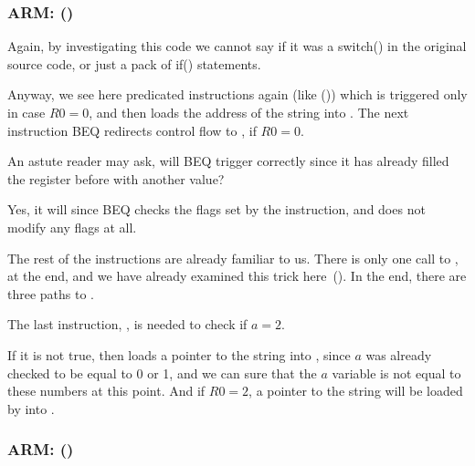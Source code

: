 \subsubsection{ARM: \OptimizingKeilVI (\ARMMode)}



Again, by investigating this code we cannot say if it was a switch() in the original source code, 
or just a pack of if() statements.


Anyway, we see here predicated instructions again (like \ADREQ ())
which is triggered only in case $R0=0$, and then loads the address of the string 
into .
The next instruction \ac{BEQ} redirects control flow to , if $R0=0$.

An astute reader may ask, will \ac{BEQ} trigger correctly since \ADREQ it
has already filled the  register before with another value?

Yes, it will since \ac{BEQ} checks the flags set by the \CMP instruction, 
and \ADREQ does not modify any flags at all.

The rest of the instructions are already familiar to us. 
There is only one call to \printf , at the end, and we have already examined this trick here~().
In the end, there are three paths to \printf{}.

The last instruction, , is needed to check if $a=2$.

If it is not true, then \ADRNE loads a pointer to the string 
into , since $a$ was already checked to be equal to 0 or 1,
and we can sure that the $a$ variable is not equal to these numbers at this point.
And if $R0=2$, 
a pointer to the string 
will be loaded by \ADREQ into .

\subsubsection{ARM: \OptimizingKeilVI (\ThumbMode)}




